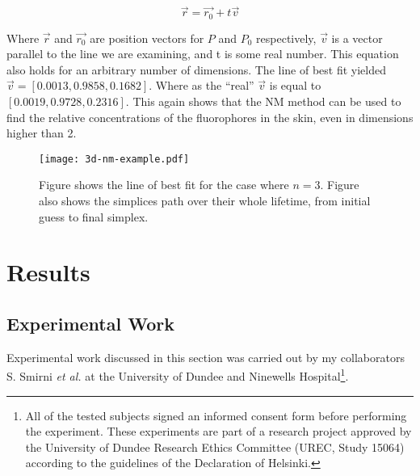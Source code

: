 \begin{equation}
\overrightarrow{r}=\overrightarrow{r_0}+t\overrightarrow{v}
\label{eqn:3dlineeqn}
\end{equation}

Where $\overrightarrow{r}$ and $\overrightarrow{r_0}$ are position vectors for $P$ and $P_0$ respectively, $\overrightarrow{v}$ is a vector parallel to the line we are examining, and t is some real number.
This equation also holds for an arbitrary number of dimensions.
The line of best fit yielded $\overrightarrow{v} =\left[0.0013, 0.9858, 0.1682\right]$.
Where as the ``real'' $\overrightarrow{v}$ is equal to $\left[0.0019, 0.9728, 0.2316\right]$.
This again shows that the NM method can be used to find the relative concentrations of the fluorophores in the skin, even in dimensions higher than 2.

\begin{figure}[!htpb]
  \centering
  \texttt{[image: 3d-nm-example.pdf]}
  \caption{Figure shows the line of best fit for the case where $n=3$. Figure also shows the simplices path over their whole lifetime, from initial guess to final simplex.}
  \label{fig:3dtoymodel}
\end{figure}

\FloatBarrier
\section{Results}

\subsection{Experimental Work}

Experimental work discussed in this section was carried out by my collaborators S. Smirni \textit{et al.} at the University of Dundee and Ninewells Hospital\footnote{All of the tested subjects signed an informed consent form before performing the experiment. These experiments are part of a research project approved by the University of Dundee Research Ethics Committee (UREC, Study 15064) according to the guidelines of the Declaration of Helsinki.}.

